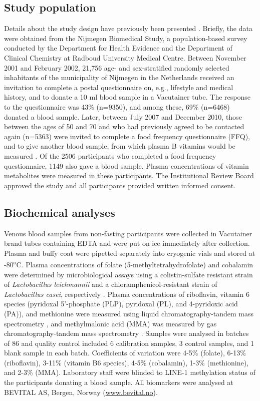 \subsection{Study population}
\noindent Details about the study design have previously been presented \cite{c321}. Briefly, the data were obtained from the Nijmegen Biomedical Study, a population-based survey conducted by the Department for Health Evidence and the Department of Clinical Chemistry at Radboud University Medical Centre. Between November 2001 and February 2002, 21,756 age- and sex-stratified randomly selected inhabitants of the municipality of Nijmegen in the Netherlands received an invitation to complete a postal questionnaire on, e.g., lifestyle and medical history, and to donate a 10 ml blood sample in a Vacutainer tube. The response to the questionnaire was 43\% (n=9350), and among these, 69\% (n=6468) donated a blood sample. Later, between July 2007 and December 2010, those between the ages of 50 and 70 and who had previously agreed to be contacted again (n=5363) were invited to complete a food frequency questionnaire (FFQ), and to give another blood sample, from which plasma B vitamins would be measured \cite{c322}. Of the 2506 participants who completed a food frequency questionnaire, 1149 also gave a blood sample. Plasma concentrations of vitamin metabolites were measured in these participants. The Institutional Review Board approved the study and all participants provided written informed consent.

\subsection{Biochemical analyses} %
\noindent Venous blood samples from non-fasting participants were collected in Vacutainer brand tubes containing EDTA and were put on ice immediately after collection. Plasma and buffy coat were pipetted separately into cryogenic vials and stored at -80\textsuperscript{o}C. Plasma concentrations of folate (5-methyltetrahydrofolate) and cobalamin were determined by microbiological assays using a colistin-sulfate resistant strain of \emph{Lactobacillus leichmannii} and a chloramphenicol-resistant strain of \emph{Lactobacillus casei}, respectively \cite{c323,c324}. Plasma concentrations of riboflavin, vitamin 6 species (pyridoxal 5'-phosphate (PLP), pyridoxal (PL), and 4-pyridoxic acid (PA)), and methionine were measured using liquid chromatography-tandem mass spectrometry \cite{c325,c326}, and methylmalonic acid (MMA) was measured by gas chromatography-tandem mass spectrometry \cite{c327}. Samples were analysed in batches of 86 and quality control included 6 calibration samples, 3 control samples, and 1 blank sample in each batch. Coefficients of variation were 4-5\% (folate), 6-13\% (riboflavin), 3-11\% (vitamin B6 species), 4-5\% (cobalamin), 1-3\% (methionine), and 2-3\% (MMA). Laboratory staff were blinded to LINE-1 methylation status of the participants donating a blood sample. All biomarkers were analysed at BEVITAL AS, Bergen, Norway (\href{www.bevital.no}{www.bevital.no}).

